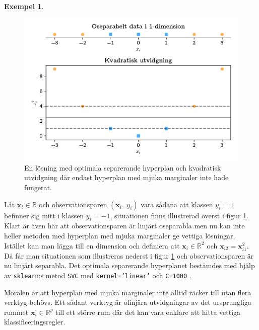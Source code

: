 \documentclass[a4paper, 12pt]{report}
\theoremstyle{definition}
\newtheorem{ex}{Exempel}[section]
\theoremstyle{remark}
\begin{document}
\begin{ex}\label{ex:olinjär}
\begin{figure}[h]
	\centering
	\includegraphics[width=0.8\linewidth, trim={0.5cm 4mm -5mm 4mm}, clip]{KandFigur3.pdf}
	\caption{\label{fig:kvadratisk}En lösning med optimala separerande hyperplan och kvadratisk utvidgning där endast hyperplan med mjuka marginaler inte hade fungerat.}
\end{figure}
Låt $\mathbf{x}_i\in\mathbb{R}$ och observationsparen $\left(\mathbf{x}_i,~y_i\right)$ vara sådana att klassen $y_i=1$ befinner sig mitt i klassen $y_i=-1$, situationen finns illustrerad överst i figur \ref{fig:kvadratisk}. Klart är även här att observationsparen är linjärt oseparabla men nu kan inte heller metoden med hyperplan med mjuka marginaler ge vettiga lösningar. Istället kan man lägga till en dimension och definiera att $\mathbf{x}_i\in\mathbb{R}^2$ och $\mathbf{x}_{i2} = \mathbf{x}_{i1}^2$.
Då får man situationen som illustreras nederst i figur \ref{fig:kvadratisk} och observationsparen är nu linjärt separabla. Det optimala separerande hyperplanet bestämdes med hjälp av \texttt{sklearn}:s metod \texttt{SVC} med \texttt{kernel='linear'} och \texttt{C=1000} \cite{sklearn}.

Moralen är att hyperplan med mjuka marginaler inte alltid räcker till utan flera verktyg behövs. Ett sådant verktyg är olinjära utvidgningar av det ursprungliga rummet $\mathbf{x}_i\in \mathbb{R}^p$ till ett större rum där det kan vara enklare att hitta vettiga klassificeringsregler.
\end{ex}
\end{document}
